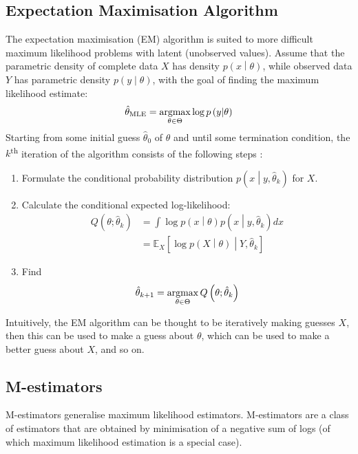 \documentclass[11pt]{report} %
\begin{document}
\subsection{Expectation Maximisation Algorithm}

The expectation maximisation (EM) algorithm is suited to more difficult maximum likelihood problems with latent (unobserved values). Assume that the parametric density of complete data $X$ has density $p\left(x\middle|\theta\right)$, while observed data $Y$ has parametric density $p\left(y\middle|\theta\right)$, with the goal of finding the maximum likelihood estimate:
\begin{equation}
\hat{\theta}_{\mathrm{MLE}} = \operatorname*{argmax}_{\theta\in\Theta}\log p\left(y\middle|\theta\right)
\end{equation}
Starting from some initial guess $\hat{\theta}_{0}$ of $\theta$ and until some termination condition, the $k$\textsuperscript{th} iteration of the algorithm consists of the following steps \cite{Gupta2010}:
\begin{enumerate}
\item Formulate the conditional probability distribution $p\left(x\middle|y, \hat{\theta}_{k}\right)$ for $X$.
\item Calculate the conditional expected log-likelihood:
\begin{align}
Q\left(\theta;\hat{\theta}_{k}\right) &= \int\log p\left(x\middle|\theta\right)p\left(x\middle|y, \hat{\theta}_{k}\right)dx \\
&= \mathbb{E}_{X}\left[\log p\left(X\middle|\theta\right) \middle| Y, \hat{\theta}_{k}\right]
\end{align}
\item Find
\begin{equation}
\hat{\theta}_{k + 1} = \operatorname*{argmax}_{\theta\in\Theta}Q\left(\theta;\hat{\theta}_{k}\right) 
\end{equation}
\end{enumerate}
Intuitively, the EM algorithm can be thought to be iteratively making guesses $X$, then this can be used to make a guess about $\theta$, which can be used to make a better guess about $X$, and so on.

\subsection{M-estimators}

M-estimators generalise maximum likelihood estimators. M-estimators are a class of estimators that are obtained by minimisation of a negative sum of logs (of which maximum likelihood estimation is a special case).
\end{document}
